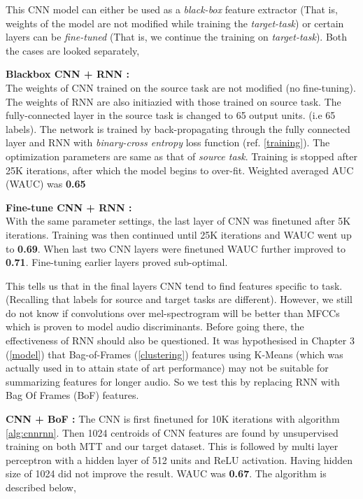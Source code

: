 \noindent This CNN model can either be used as a \textit{black-box} feature extractor (That is, weights of the model are not modified while training the \textit{target-task}) or certain layers can be \textit{fine-tuned} (That is, we continue the training on \textit{target-task}). Both the cases are looked separately,
\bigskip

\noindent \textbf{Blackbox CNN + RNN :}\\ 
The weights of CNN trained on the source task are not modified (no fine-tuning). The weights of RNN are also initiazied with those trained on source task. The fully-connected layer in the source task is changed to 65 output units. (i.e 65 labels). The network is trained by back-propagating through the fully connected layer and RNN with \textit{binary-cross entropy} loss function (ref. \ref{training}). The optimization parameters are same as that of \textit{source task}. Training is stopped after 25K iterations, after which the model begins to over-fit. Weighted averaged AUC (WAUC) was \textbf{0.65}
\bigskip

\noindent \textbf{Fine-tune CNN + RNN :}\\
With the same parameter settings, the last layer of CNN was finetuned after 5K iterations. Training was then continued until 25K iterations and WAUC went up to \textbf{0.69}. When last two CNN layers were finetuned WAUC further improved to \textbf{0.71}. Fine-tuning earlier layers proved sub-optimal. 
\bigskip

\noindent This tells us that in the final layers CNN tend to find features specific to task. (Recalling that labels for source and target tasks are different). However, we still do not know if convolutions over mel-spectrogram will be better than MFCCs which is proven to model audio discriminants. Before going there, the effectiveness of RNN should also be questioned. It was hypothesised in Chapter 3 (\ref{model}) that Bag-of-Frames (\ref{clustering}) features using K-Means (which was actually used in \cite{MultiScale} to attain state of art performance) may not be suitable for summarizing features for longer audio. So we test this by replacing RNN with Bag Of Frames (BoF) features.
\bigskip

\noindent \textbf{CNN + BoF :}
The CNN is first finetuned for 10K iterations with algorithm \ref{alg:cnnrnn}. Then 1024 centroids of CNN features are found by unsupervised training on both MTT and our target dataset. This is followed by multi layer perceptron with a hidden layer of 512 units and ReLU activation. Having hidden size of 1024 did not improve the result. WAUC was \textbf{0.67}. The algorithm is described below,

